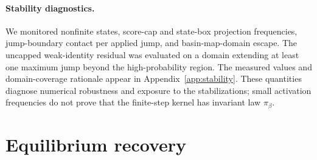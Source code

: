 \documentclass[11pt]{article}
\newcommand{\piB}{\pi_\beta}
\begin{document}
\paragraph{Stability diagnostics.}
We monitored nonfinite states, score-cap and state-box projection frequencies,
jump-boundary contact per applied jump, and basin-map-domain escape.  The
uncapped weak-identity residual was evaluated on a domain extending at least
one maximum jump beyond the high-probability region.  The measured values and
domain-coverage rationale appear in Appendix~\ref{app:stability}.  These
quantities diagnose numerical robustness and exposure to the stabilizations;
small activation frequencies do not prove that the finite-step kernel has
invariant law $\piB$.

\section{Equilibrium recovery}
\label{sec:recovery}
\end{document}
